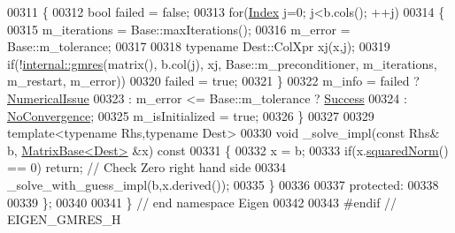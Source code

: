 \begin{DoxyCode}
00311 \textcolor{keyword}{  }\{
00312     \textcolor{keywordtype}{bool} failed = \textcolor{keyword}{false};
00313     \textcolor{keywordflow}{for}(\hyperlink{namespace_eigen_a62e77e0933482dafde8fe197d9a2cfde}{Index} j=0; j<b.cols(); ++j)
00314     \{
00315       m\_iterations = Base::maxIterations();
00316       m\_error = Base::m\_tolerance;
00317 
00318       \textcolor{keyword}{typename} Dest::ColXpr xj(x,j);
00319       \textcolor{keywordflow}{if}(!\hyperlink{namespace_eigen_1_1internal_a851df31ae9133639a8eb3f6a8484bbf7}{internal::gmres}(matrix(), b.col(j), xj, Base::m\_preconditioner, m\_iterations, 
      m\_restart, m\_error))
00320         failed = \textcolor{keyword}{true};
00321     \}
00322     m\_info = failed ? \hyperlink{group__enums_gga85fad7b87587764e5cf6b513a9e0ee5eaaf9b736d310a664e7729d163a035cc5f}{NumericalIssue}
00323           : m\_error <= Base::m\_tolerance ? \hyperlink{group__enums_gga85fad7b87587764e5cf6b513a9e0ee5ea52581b035f4b59c203b8ff999ef5fcea}{Success}
00324           : \hyperlink{group__enums_gga85fad7b87587764e5cf6b513a9e0ee5eaba1c8763d1179778070f365ecc4157a8}{NoConvergence};
00325     m\_isInitialized = \textcolor{keyword}{true};
00326   \}
00327 
00329   \textcolor{keyword}{template}<\textcolor{keyword}{typename} Rhs,\textcolor{keyword}{typename} Dest>
00330   \textcolor{keywordtype}{void} \_solve\_impl(\textcolor{keyword}{const} Rhs& b, \hyperlink{group___core___module_class_eigen_1_1_matrix_base}{MatrixBase<Dest>} &x)\textcolor{keyword}{ const}
00331 \textcolor{keyword}{  }\{
00332     x = b;
00333     \textcolor{keywordflow}{if}(x.\hyperlink{group___core___module_a8782faeb21e43908cdce47cec06fba23}{squaredNorm}() == 0) \textcolor{keywordflow}{return}; \textcolor{comment}{// Check Zero right hand side}
00334     \_solve\_with\_guess\_impl(b,x.derived());
00335   \}
00336 
00337 \textcolor{keyword}{protected}:
00338 
00339 \};
00340 
00341 \} \textcolor{comment}{// end namespace Eigen}
00342 
00343 \textcolor{preprocessor}{#endif // EIGEN\_GMRES\_H}
\end{DoxyCode}
